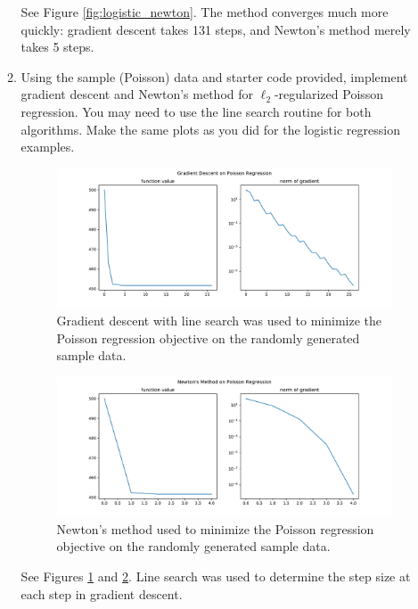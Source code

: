 \documentclass[11pt]{amsart}
\begin{document}
\begin{enumerate}
\begin{enumerate}
See Figure \ref{fig:logistic_newton}. The method converges much more quickly:
gradient descent takes 131 steps, and Newton's method merely takes 5 steps.
  
\item Using the sample (Poisson) data  and starter code provided, implement gradient descent and Newton's method for $\ell_2$-regularized Poisson regression. You may need to use the line search routine for 
  both algorithms. Make the same plots as you did for the logistic regression examples.

  \begin{figure}
  \centering
  \includegraphics[width=\textwidth]{poisson_gradient_descent.pdf}
  \caption{Gradient descent with line search was used to minimize the Poisson
    regression objective on the randomly generated sample data.}
  \label{fig:poisson_gradient_descent}
\end{figure}

\begin{figure}
  \centering
  \includegraphics[width=\textwidth]{poisson_newton.pdf}
  \caption{Newton's method used to minimize the Poisson regression objective on
    the randomly generated sample data.}
  \label{fig:poisson_newton}
\end{figure}

See Figures \ref{fig:poisson_gradient_descent} and
\ref{fig:poisson_newton}. Line search was used to determine the step size at
each step in gradient descent.
  

\end{enumerate}
\end{enumerate}
\end{document}
